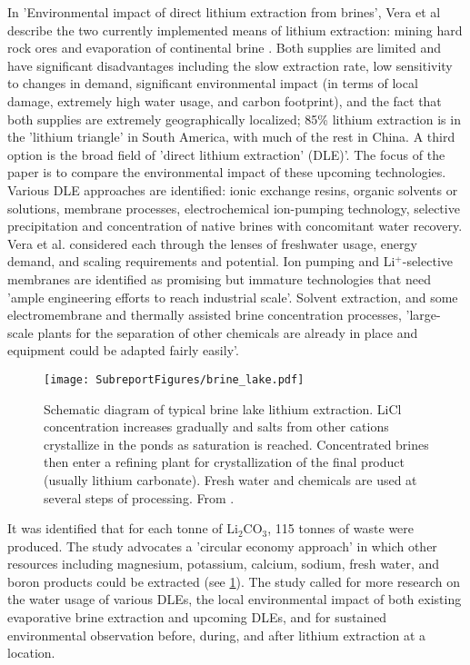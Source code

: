 In 'Environmental impact of direct lithium extraction from brines', Vera et al describe the two currently implemented means of lithium extraction: mining hard rock ores and evaporation of continental brine \cite{vera2023environmental}. Both supplies are limited and have significant disadvantages including the slow extraction rate, low sensitivity to changes in demand, significant environmental impact (in terms of local damage, extremely high water usage, and carbon footprint), and the fact that both supplies are extremely geographically localized; 85\% lithium extraction is in the 'lithium triangle' in South America, with much of the rest in China. A third option is the broad field of 'direct lithium extraction' (DLE)'. The focus of the paper is to compare the environmental impact of these upcoming technologies. Various DLE approaches are identified: ionic exchange resins, organic solvents or solutions, membrane processes, electrochemical ion-pumping technology, selective precipitation and concentration of native brines with concomitant water recovery. Vera et al. considered each through the lenses of freshwater usage, energy demand, and scaling requirements and potential. Ion pumping and Li$^+$-selective membranes are identified as promising but immature technologies that need 'ample engineering efforts to reach industrial scale'. Solvent extraction, and some electromembrane and thermally assisted brine concentration processes,  'large-scale plants for the separation of other chemicals are already in place and equipment could be adapted fairly easily'.

\begin{figure}[h!]
    \centering
    \texttt{[image: SubreportFigures/brine\_lake.pdf]}
    \caption{Schematic diagram of typical brine lake lithium extraction.  LiCl concentration 
increases gradually and salts from other cations crystallize in the ponds as 
saturation is reached. Concentrated brines then enter a refining plant for 
crystallization of the final product (usually lithium carbonate). Fresh water and 
chemicals are used at several steps of processing. From \cite{vera2023environmental}. }
    \label{fig:circ_economy}
\end{figure}

It was identified that for each tonne of Li$_2$CO$_3$, 115 tonnes of waste were produced. The study advocates a 'circular economy approach' in which other resources including magnesium, potassium, calcium, sodium, fresh water, and boron products could be extracted (see \ref{fig:circ_economy}). The study called for more research on the water usage of various DLEs, the local environmental impact of both existing evaporative brine extraction and upcoming DLEs, and for sustained environmental observation before, during, and after lithium extraction at a location.

